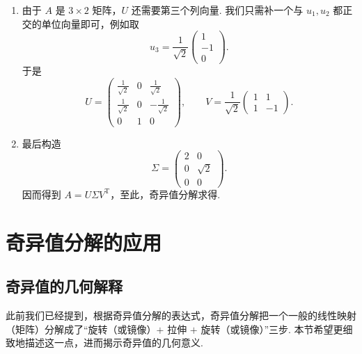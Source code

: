 \begin{solution}
\begin{enumerate}
        \item 由于 $A$ 是 $3 \times 2$ 矩阵，$U$ 还需要第三个列向量. 我们只需补一个与 $u_1, u_2$ 都正交的单位向量即可，例如取
              \[
                  u_3 = \frac{1}{\sqrt{2}}
                  \begin{pmatrix}
                      1  \\
                      -1 \\
                      0
                  \end{pmatrix}.
              \]
              于是
              \[
                  U =
                  \begin{pmatrix}
                      \frac{1}{\sqrt{2}} & 0 & \frac{1}{\sqrt{2}}  \\
                      \frac{1}{\sqrt{2}} & 0 & -\frac{1}{\sqrt{2}} \\
                      0                  & 1 & 0
                  \end{pmatrix},\qquad
                  V =
                  \frac{1}{\sqrt{2}}
                  \begin{pmatrix}
                      1 & 1  \\
                      1 & -1
                  \end{pmatrix}.
              \]

        \item 最后构造
              \[
                  \Sigma =
                  \begin{pmatrix}
                      2 & 0        \\
                      0 & \sqrt{2} \\
                      0 & 0
                  \end{pmatrix}.
              \]
              因而得到 $A = U\Sigma V^{\mathrm{T}}$，至此，奇异值分解求得.
    \end{enumerate}
\end{solution}

\section{奇异值分解的应用}

\subsection{奇异值的几何解释}

此前我们已经提到，根据奇异值分解的表达式，奇异值分解把一个一般的线性映射（矩阵）分解成了“旋转（或镜像）$+$ 拉伸 $+$ 旋转（或镜像）”三步. 本节希望更细致地描述这一点，进而揭示奇异值的几何意义.

